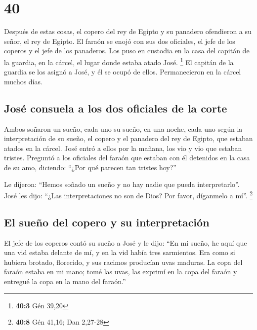 \hypertarget{section-39}{%
\section{40}\label{section-39}}

 Después de estas cosas, el copero del rey de Egipto y su
panadero ofendieron a su señor, el rey de Egipto.  El
faraón se enojó con sus dos oficiales, el jefe de los coperos y el jefe
de los panaderos.  Los puso en custodia en la casa del
capitán de la guardia, en la cárcel, el lugar donde estaba atado José.
\footnote{\textbf{40:3} Gén 39,20}  El capitán de la
guardia se los asignó a José, y él se ocupó de ellos. Permanecieron en
la cárcel muchos días.

\hypertarget{josuxe9-consuela-a-los-dos-oficiales-de-la-corte}{%
\subsection{José consuela a los dos oficiales de la
corte}\label{josuxe9-consuela-a-los-dos-oficiales-de-la-corte}}

 Ambos soñaron un sueño, cada uno su sueño, en una noche,
cada uno según la interpretación de su sueño, el copero y el panadero
del rey de Egipto, que estaban atados en la cárcel.  José
entró a ellos por la mañana, los vio y vio que estaban tristes.
 Preguntó a los oficiales del faraón que estaban con él
detenidos en la casa de su amo, diciendo: ``¿Por qué parecen tan tristes
hoy?''

 Le dijeron: ``Hemos soñado un sueño y no hay nadie que
pueda interpretarlo''. José les dijo: ``¿Las interpretaciones no son de
Dios? Por favor, díganmelo a mí''. \footnote{\textbf{40:8} Gén 41,16;
  Dan 2,27-28}

\hypertarget{el-sueuxf1o-del-copero-y-su-interpretaciuxf3n}{%
\subsection{El sueño del copero y su
interpretación}\label{el-sueuxf1o-del-copero-y-su-interpretaciuxf3n}}

 El jefe de los coperos contó su sueño a José y le dijo:
``En mi sueño, he aquí que una vid estaba delante de mí, 
y en la vid había tres sarmientos. Era como si hubiera brotado,
florecido, y sus racimos producían uvas maduras.  La copa
del faraón estaba en mi mano; tomé las uvas, las exprimí en la copa del
faraón y entregué la copa en la mano del faraón.''

